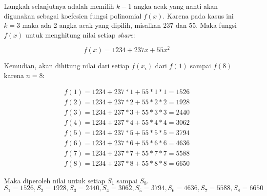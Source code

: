 Langkah selanjutnya adalah memilih \begin{math}k-1\end{math} angka acak yang nanti akan digunakan sebagai koefesien fungsi polinomial \begin{math}f(x)\end{math}. Karena pada kasus ini \begin{math}k=3\end{math} maka ada 2 angka acak yang dipilih, misalkan 237 dan 55. Maka fungsi \begin{math}f(x)\end{math} untuk menghitung nilai setiap \textit{share}:

\begin{equation}
	f(x) = 1234 + 237x + 55x^2
\end{equation}

Kemudian, akan dihitung nilai dari setiap \begin{math}f(x_i)\end{math} dari \begin{math}f(1)\end{math} sampai \begin{math}f(8)\end{math} karena \begin{math}n=8\end{math}:

\begin{gather*}
	f(1) = 1234 + 237*1 + 55*1*1 = 1526	\\
	f(2) = 1234 + 237*2 + 55*2*2 = 1928	\\
	f(3) = 1234 + 237*3 + 55*3*3 = 2440	\\
	f(4) = 1234 + 237*4 + 55*4*4 = 3062	\\
	f(5) = 1234 + 237*5 + 55*5*5 = 3794	\\
	f(6) = 1234 + 237*6 + 55*6*6 = 4636	\\
	f(7) = 1234 + 237*7 + 55*7*7 = 5588	\\
	f(8) = 1234 + 237*8 + 55*8*8 = 6650
\end{gather*}

Maka diperoleh nilai untuk setiap \begin{math}S_1\end{math} sampai \begin{math}S_8\end{math}.
\begin{displaymath}
	S_1 = 1526, S_2 = 1928, S_3 = 2440, S_4 = 3062, S_5 = 3794, S_6 = 4636, S_7 = 5588, S_8 = 6650
\end{displaymath}

